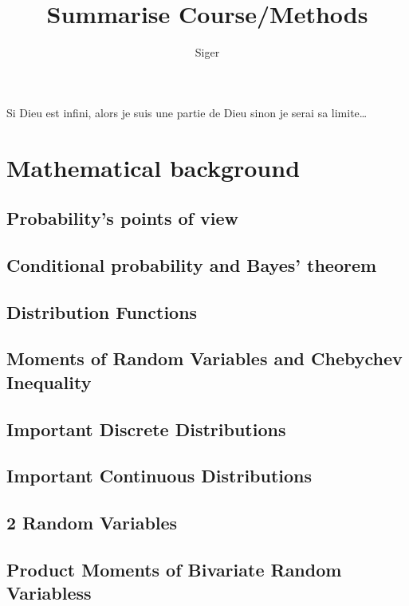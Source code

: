 \documentclass[a4paper, 10pt]{scrbook}  %
\title{Summarise Course/Methods}
\author{Siger}
\begin{document}
\maketitle

Si Dieu est infini, alors je suis une partie de Dieu sinon je serai sa limite\ldots

\tableofcontents
\part{Mathematical background}
\chapter{Probability's points of view}

\chapter{Conditional probability and Bayes' theorem}

\chapter{Distribution Functions}

\chapter{Moments of Random Variables and Chebychev Inequality}

%
\chapter{Important Discrete Distributions}

\chapter{Important Continuous Distributions}

\chapter{2 Random Variables}

\chapter{Product Moments of Bivariate Random Variabless}

\end{document}
